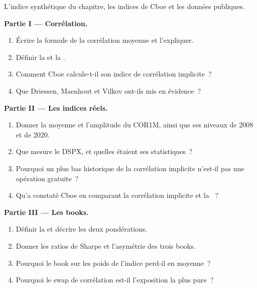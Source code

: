\begin{problem}\label{pb:s2:dispersion-and-correlation:1}
L'indice synthétique du chapitre, les indices de Cboe et les données publiques.

\medskip\noindent\textbf{Partie I --- Corrélation.}
\begin{enumerate}
\item Écrire la formule de la corrélation moyenne et l'expliquer.
\item Définir la  et la .
\item Comment Cboe calcule-t-il son indice de corrélation implicite~?
\item Que Driessen, Maenhout et Vilkov ont-ils mis en évidence~?
\end{enumerate}

\medskip\noindent\textbf{Partie II --- Les indices réels.}
\begin{enumerate}[resume]
\item Donner la moyenne et l'amplitude du COR1M, ainsi que ses niveaux de 2008 et de 2020.
\item Que mesure le DSPX, et quelles étaient ses statistiques~?
\item Pourquoi un plus bas historique de la corrélation implicite n'est-il pas une opération gratuite~?
\item Qu'a constaté Cboe en comparant la corrélation implicite et la ~?
\end{enumerate}

\medskip\noindent\textbf{Partie III --- Les books.}
\begin{enumerate}[resume]
\item Définir la  et décrire les deux pondérations.
\item Donner les ratios de Sharpe et l'asymétrie des trois books.
\item Pourquoi le book sur les poids de l'indice perd-il en moyenne~?
\item Pourquoi le swap de corrélation est-il l'exposition la plus pure~?
\end{enumerate}


\end{problem}
